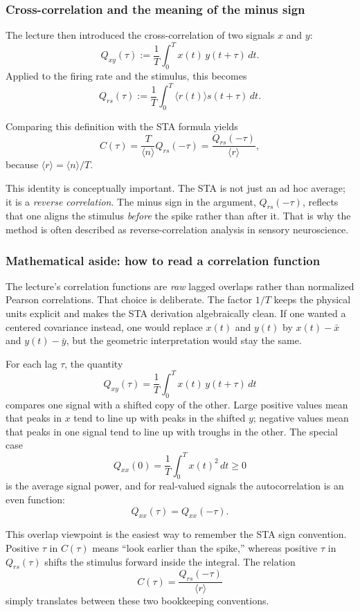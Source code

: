 \documentclass[11pt]{article}
\begin{document}
\subsubsection{Cross-correlation and the meaning of the minus sign}

The lecture then introduced the cross-correlation of two signals $x$ and $y$:
\[
Q_{xy}(\tau) := \frac{1}{T}\int_0^T x(t)\,y(t+\tau)\,dt.
\]
Applied to the firing rate and the stimulus, this becomes
\[
Q_{rs}(\tau) := \frac{1}{T}\int_0^T \langle r(t)\rangle s(t+\tau)\,dt.
\]

Comparing this definition with the STA formula yields
\[
C(\tau) = \frac{T}{\langle n \rangle} Q_{rs}(-\tau)
       = \frac{Q_{rs}(-\tau)}{\langle r \rangle},
\]
because $\langle r \rangle = \langle n \rangle / T$.

This identity is conceptually important. The STA is not just an ad hoc average; it is a \emph{reverse correlation}. The minus sign in the argument, $Q_{rs}(-\tau)$, reflects that one aligns the stimulus \emph{before} the spike rather than after it. That is why the method is often described as reverse-correlation analysis in sensory neuroscience.

\subsubsection{Mathematical aside: how to read a correlation function}

The lecture's correlation functions are \emph{raw} lagged overlaps rather than normalized Pearson correlations. That choice is deliberate. The factor $1/T$ keeps the physical units explicit and makes the STA derivation algebraically clean. If one wanted a centered covariance instead, one would replace $x(t)$ and $y(t)$ by $x(t)-\bar{x}$ and $y(t)-\bar{y}$, but the geometric interpretation would stay the same.

For each lag $\tau$, the quantity
\[
Q_{xy}(\tau)=\frac{1}{T}\int_0^T x(t)\,y(t+\tau)\,dt
\]
compares one signal with a shifted copy of the other. Large positive values mean that peaks in $x$ tend to line up with peaks in the shifted $y$; negative values mean that peaks in one signal tend to line up with troughs in the other. The special case
\[
Q_{xx}(0)=\frac{1}{T}\int_0^T x(t)^2\,dt \ge 0
\]
is the average signal power, and for real-valued signals the autocorrelation is an even function:
\[
Q_{xx}(\tau)=Q_{xx}(-\tau).
\]

This overlap viewpoint is the easiest way to remember the STA sign convention. Positive $\tau$ in $C(\tau)$ means ``look earlier than the spike,'' whereas positive $\tau$ in $Q_{rs}(\tau)$ shifts the stimulus forward inside the integral. The relation
\[
C(\tau)=\frac{Q_{rs}(-\tau)}{\langle r \rangle}
\]
simply translates between these two bookkeeping conventions.
\end{document}
